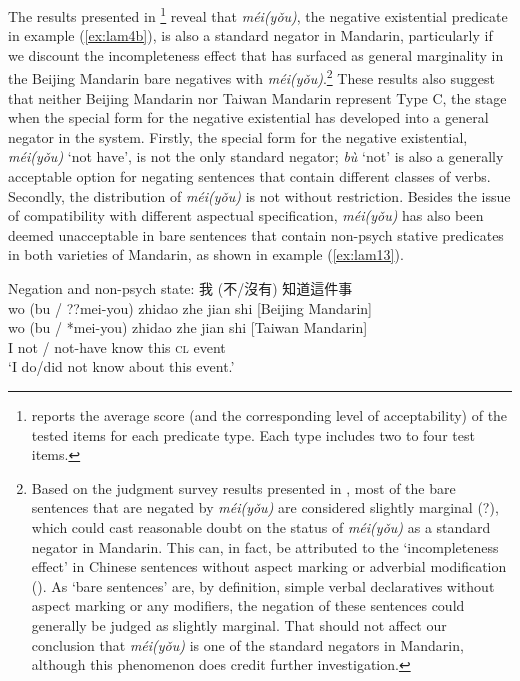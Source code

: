 \documentclass[output=paper]{langscibook}
\begin{document}
The results presented in \footnote{ reports the average score (and the corresponding level of acceptability) of the tested items for each predicate type. Each type includes two to four test items.} reveal that \textit{méi(yǒu)}, the negative existential predicate in example (\ref{ex:lam4b}), is also a standard negator in Mandarin, particularly if we discount the incompleteness effect that has surfaced as general marginality in the Beijing Mandarin bare negatives with \textit{méi(yǒu)}.\footnote{Based on the judgment survey results presented in , most of the bare sentences that are negated by \textit{méi(yǒu)} are considered slightly marginal (?), which could cast reasonable doubt on the status of \textit{méi(yǒu)} as a standard negator in Mandarin. This can, in fact, be attributed to the `incompleteness effect' in Chinese sentences without aspect marking or adverbial modification (\citealt{Tsai2008}).
As `bare sentences' are, by definition, simple verbal declaratives without aspect marking or any modifiers, the negation of these sentences could generally be judged as slightly marginal. That should not affect our conclusion that \textit{méi(yǒu)} is one of the standard negators in Mandarin, although this phenomenon does credit further investigation.} 
These results also suggest that neither Beijing Mandarin nor Taiwan Mandarin represent Type C, the stage when the special form for the negative existential has developed into a general negator in the system. Firstly, the special form for the negative existential, \textit{méi(yǒu)} `not have', is not the only standard negator; \textit{bù} `not' is also a generally acceptable option for negating sentences that contain different classes of verbs. Secondly, the distribution of \textit{méi(yǒu)} is not without restriction. Besides the issue of compatibility with different aspectual specification, \textit{méi(yǒu)} has also been deemed unacceptable in bare sentences that contain non-psych stative predicates in both varieties of Mandarin, as shown in example (\ref{ex:lam13}). 


\ea Negation and non-psych state: {\cn 我 (不/沒有) 知道這件事} \label{ex:lam13}\\
  \glll wo {(bu / ??mei-you)} zhidao zhe jian shi {[Beijing Mandarin]}\\
  {wo} {(bu / *mei-you)} {zhidao} {zhe} {jian} {shi} {[Taiwan Mandarin]}\\
  I {not / not-have} know this \textsc{cl} event\\
  \glt `I do/did not know about this event.' 
\z 
\end{document}
